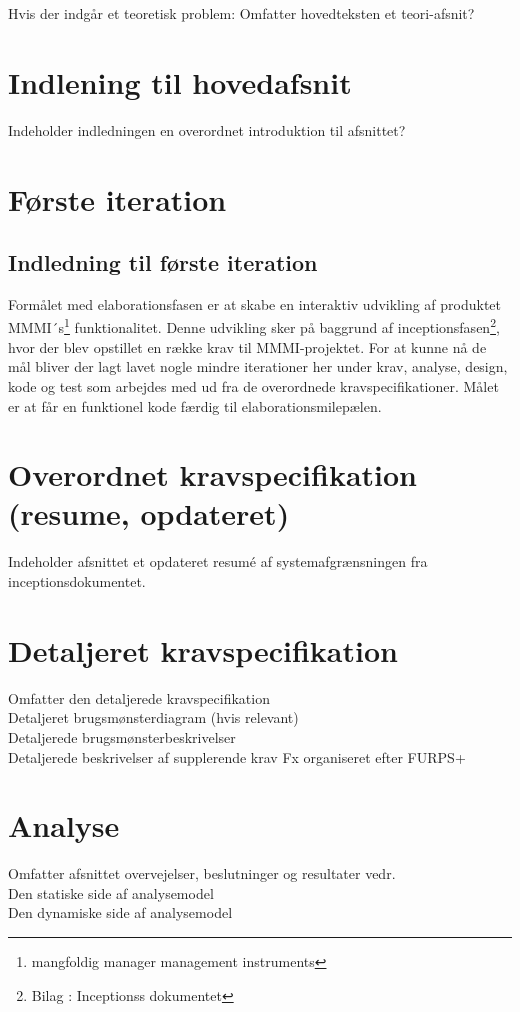 Hvis der indgår et teoretisk problem: Omfatter hovedteksten et teori-afsnit?\\
\section{Indlening til hovedafsnit}
Indeholder indledningen en overordnet introduktion til afsnittet?\\
\section{Første iteration}
\subsection{Indledning til første iteration}
Formålet med elaborationsfasen er at skabe en interaktiv udvikling af produktet MMMI´s\footnote{{mangfoldig manager management instruments}} funktionalitet. Denne udvikling sker på baggrund af inceptionsfasen\footnote{{Bilag : Inceptionss dokumentet}}, hvor der blev opstillet en række krav til MMMI-projektet.  For at kunne nå de mål bliver der lagt lavet nogle mindre iterationer her under krav, analyse, design, kode og test som arbejdes med ud fra de overordnede kravspecifikationer. Målet er at får en funktionel kode færdig til elaborationsmilepælen. 



\section{Overordnet kravspecifikation (resume, opdateret)}
Indeholder afsnittet et opdateret resumé  af systemafgrænsningen fra inceptionsdokumentet.
\section{Detaljeret kravspecifikation}
Omfatter den detaljerede kravspecifikation\\
Detaljeret brugsmønsterdiagram (hvis relevant)\\
Detaljerede brugsmønsterbeskrivelser\\
Detaljerede beskrivelser af supplerende krav Fx organiseret efter FURPS+\\

\section{Analyse}
Omfatter afsnittet overvejelser, beslutninger og resultater vedr.\\
Den statiske side af analysemodel\\
Den dynamiske side af analysemodel\\

